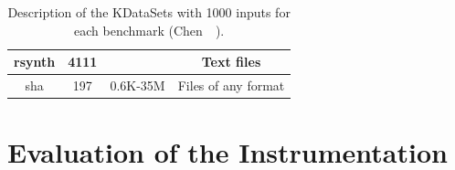 \begin{table}[h]
{\begin{tabular}{|c|c|c|c|}
rsynth        & 4111   &                            &  Text files                    \\ \hline %
sha           & 197    & 0.6K-35M                   & Files of any format            \\ \hline
\end{tabular}
}
\caption{Description of the KDataSets with 1000 inputs for each benchmark (Chen~\etal~\cite{chen10,chen12a}).}
\label{tab:kdatasets}
\end{table}

\section{Evaluation of the Instrumentation}


